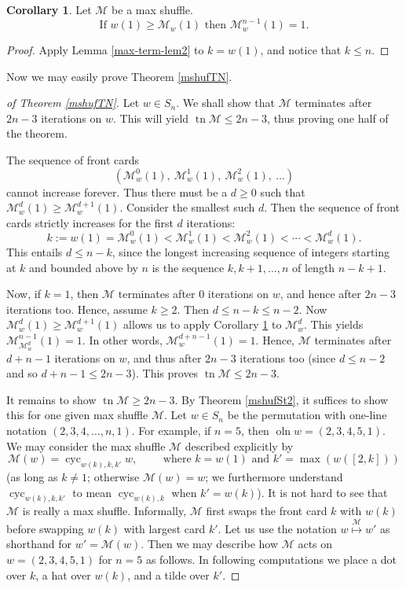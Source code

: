 \documentclass[final,nomarks]{dmtcs-episciences}
\theoremstyle{definition}
\newtheorem{cor}[thm]{Corollary}
\theoremstyle{definition}
\theoremstyle{remark}
\newcommand{\M}{\mathcal{M}} %
\newcommand{\Mw}{\mathcal{M}_w} %
\newcommand{\tn}{\operatorname{tn }} %
\newcommand{\tup}[1]{\left( #1 \right)}
\newcommand{\cyc}[1]{\operatorname{cyc}_{#1}}
\newcommand{\oln}{\operatorname{oln}}
\begin{document}
\begin{cor}
    \label{max-term-cor}
    Let $ \M $ be a max shuffle. 
    \[
        \text{If } w\tup{1} \ge \Mw\tup{ 1 } \text{ then } \Mw^{n-1}\tup{ 1 } = 1 .
    \]
\end{cor}
\begin{proof}
    Apply Lemma \ref{max-term-lem2} to $k = w\tup{1}$, and notice that $k \le n$.
\end{proof}

Now we may easily prove Theorem \ref{mshufTN}.

\begin{proof}[of Theorem \ref{mshufTN}]
Let $w \in S_n$. We shall show that $\M$ terminates after $2n-3$ iterations on $w$. This will yield $\tn \M \le 2n-3$, thus proving one half of the theorem.

The sequence of front cards
\[
\tup{\Mw^0(1),\ \Mw^1(1),\ \Mw^2(1),\ \dots}
\]
cannot increase forever.
Thus there must be a $d \ge 0$ such that $\Mw^d(1) \ge \Mw^{d+1}(1)$.
Consider the smallest such $d$.
Then the sequence of front cards strictly increases for the first $d$ iterations:
\[
k := w(1) = \Mw^0(1) < \Mw^1(1) < \Mw^2(1) < \cdots < \Mw^d(1).
\]
This entails $d \le n-k$, since the longest increasing sequence of integers starting at $k$ and bounded above by $n$ is the sequence $k,k+1,\dots,n$ of length $n-k+1$. 

Now, if $k=1$, then $\M$ terminates after $0$ iterations on $w$, and hence after $2n-3$ iterations too.
Hence, assume $k \ge 2$. Then $d \le n-k \le n-2$. Now $\Mw^d(1) \ge \Mw^{d+1}(1)$ allows us to apply Corollary \ref{max-term-cor} to $\Mw^d$. This yields $\M^{n-1}_{\M^d_w}\tup{1} = 1$. In other words, $\Mw^{d+n-1}\tup{1} = 1$.
Hence, $\M$ terminates after $d+n-1$ iterations on $w$, and thus after $2n-3$ iterations too (since $d \le n-2$ and so $d+n-1 \le 2n-3$).
This proves $\tn \M \le 2n-3$.

It remains to show $\tn \M \ge 2n-3$.
By Theorem \ref{mshufSt2}, it suffices to show this for one given max shuffle $\M$.
Let $w \in S_n$ be the permutation with one-line notation $(2,3,4,\dots,n,1)$. For example, if $n=5$, then $\oln w = (2,3,4,5,1)$.
We may consider the max shuffle $\M$ described explicitly by
\[
\M\tup{w} = \cyc{w\tup{k},k,k'} w, \qquad \text{ where } k = w\tup{1} \text{ and } k' = \max\tup{w\tup{[2,k]}}
\]
(as long as $k \neq 1$; otherwise $\M\tup{w} = w$; we furthermore understand $\cyc{w\tup{k},k,k'}$ to mean $\cyc{w\tup{k},k}$ when $k' = w\tup{k}$).
It is not hard to see that $\M$ is really a max shuffle.
Informally, $\M$ first swaps the front card $k$ with $w(k)$ before swapping $w(k)$ with largest card $k'$.
Let us use the notation $w \overset{\M}{ \mapsto } w'$ as shorthand for $w' = \M(w)$.
Then we may describe how $\M$ acts on $w=\tup{2,3,4,5,1}$ for $n = 5$ as follows. In following computations we place a dot over $k$, a hat over $w(k)$, and a tilde over $k'$.


\end{proof}
\end{document}
